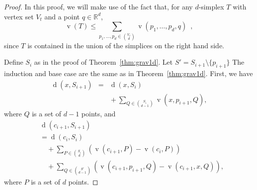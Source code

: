\documentclass{cccg10}
\DeclareMathOperator{\od}{d}
\DeclareMathOperator{\vol}{v}
\begin{document}
\begin{proof}
In this proof, we will make use of the fact that, for any $d$-simplex $T$ with vertex set $V_t$ and a point
$q\in\mathbb{R}^d$,
\begin{equation}
  \vol(T) \le \sum_{p_1,\ldots,p_d\in\binom{V_t}{d}} \vol(p_1,\ldots,p_d,q)\enspace , 
   \label{eq:cover}
\end{equation}
since $T$ is contained in the union of the simplices on the right hand side.

Define $S_i$ as in the proof of Theorem~\ref{thm:grav1d}. Let $S' = S_{i+1}\setminus \{p_{i+1}\}$ The induction
and base case are the same as in Theorem~\ref{thm:grav1d}. First, we have
\begin{eqnarray}
\od(x,S_{i+1}) 
   & = & \od(x,S_i) \nonumber \\
   && {} + \sum_{Q\in\binom{S_i}{d-1}} \vol(x,p_{i+1},Q), \label{eq:o}
\end{eqnarray}
where $Q$ is a set of $d-1$ points, and
\begin{align}
   & \!\!\! \od(c_{i+1},S_{i+1}) \nonumber \\
   & = \od(c_i,S_{i}) \nonumber \\
   &    \quad + \sum_{P \in \binom{S_i}{d}} 
           (\vol(c_{i+1}, P)- \vol(c_i,P))
              \label{eq:i} \\
   &   \quad + \sum_{Q\in \binom{S'}{d-1}}
           (\vol(c_{i+1},p_{i+1},Q)- \vol(c_{i+1},x,Q)),
            \label{eq:ii} 
\end{align}
where $P$ is a set of $d$ points.


\end{proof}
\end{document}
